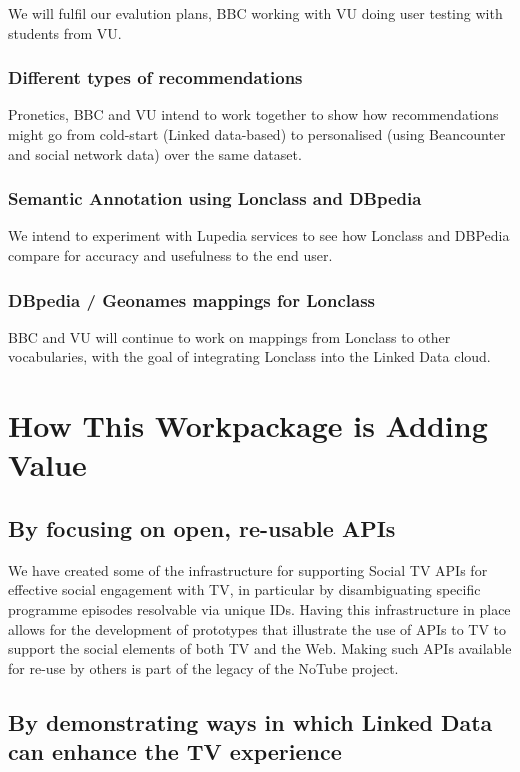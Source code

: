 \documentclass{notube}
\begin{document}
We will fulfil our evalution plans, BBC working with VU doing user testing with students from VU.

\subsection{Different types of recommendations}

Pronetics, BBC and VU intend to work together to show how recommendations might go from cold-start (Linked data-based) to personalised (using Beancounter and social network data) over the same dataset. 

\subsection{Semantic Annotation using Lonclass and DBpedia}

We intend to experiment with Lupedia services to see how Lonclass and DBPedia compare for accuracy and usefulness to the end user.

\subsection{DBpedia / Geonames mappings for Lonclass}

BBC and VU will continue to work on mappings from Lonclass to other vocabularies, with the goal of integrating Lonclass into the Linked Data cloud.


\chapter{How This Workpackage is Adding Value}

\section{By focusing on open, re-usable APIs}

We have created some of the infrastructure for supporting Social TV APIs for effective social engagement with TV, in particular by disambiguating specific programme episodes resolvable via unique IDs. Having this infrastructure in place allows for the development of prototypes that illustrate the use of APIs to TV to support the social elements of both TV and the Web. Making such APIs available for re-use by others is part of the legacy of the NoTube project.

\section{By demonstrating ways in which Linked Data can enhance the TV experience}
\end{document}
